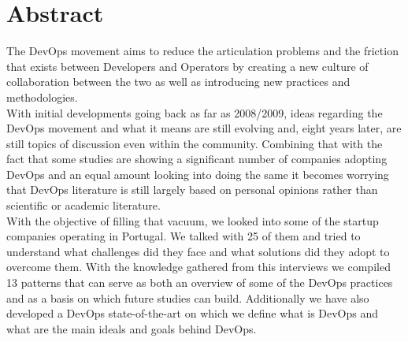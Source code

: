 \chapter*{Abstract}

The DevOps movement aims to reduce the articulation problems and the friction that exists between Developers and Operators by creating a new culture of collaboration between the two as well as introducing new practices and methodologies. \\
With initial developments going back as far as 2008/2009, ideas regarding the DevOps movement and what it means are still evolving and, eight years later, are still topics of discussion even within the community. Combining that with the fact that some studies are showing a significant number of companies adopting DevOps and an equal amount looking into doing the same it becomes worrying that DevOps literature is still largely based on personal opinions rather than scientific or academic literature.\\
With the objective of filling that vacuum, we looked into some of the startup companies operating in Portugal. We talked with 25 of them and tried to understand what challenges did they face and what solutions did they adopt to overcome them. With the knowledge gathered from this interviews we compiled 13 patterns that can serve as both an overview of some of the DevOps practices and as a basis on which future studies can build. Additionally we have also developed a DevOps state-of-the-art on which we define what is DevOps and what are the main ideals and goals behind DevOps.
